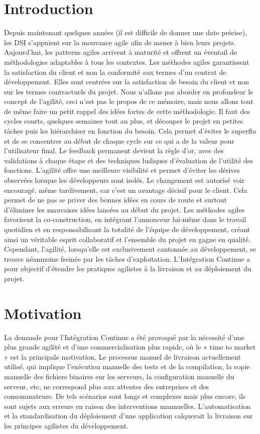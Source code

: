 \documentclass{report}
\begin{document}
    \section{Introduction}
    Depuis maintenant quelques années (il est difficile de donner une date précise), les DSI s’appuient sur la mouvance agile afin de mener à bien leurs projets. Aujourd’hui, les patterns agiles arrivent à maturité et offrent un éventail de méthodologies adaptables à tous les contextes. Les méthodes agiles garantissent la satisfaction du client et non la conformité aux termes d’un contrat de développement. Elles sont centrées sur la satisfaction de besoin du client et non sur les termes contractuels du projet. Nous n’allons pas aborder en profondeur le concept de l’agilité, ceci n’est pas le propos de ce mémoire, mais nous allons tout de même faire un petit rappel des idées fortes de cette méthodologie. Il faut des cycles courts, quelques semaines tout au plus, et découper le projet en petites tâches puis les hiérarchiser en fonction du besoin. Cela permet d’éviter le superflu et de se concentrer au début de chaque cycle sur ce qui a de la valeur pour l’utilisateur final. Le feedback permanent devient la règle d’or, avec des validations à chaque étape et des techniques ludiques d’évaluation de l’utilité des fonctions. L’agilité offre une meilleure visibilité et permet d’éviter les dérives observées lorsque les développeurs sont isolés. Le changement est autorisé voir encouragé, même tardivement, car c’est un avantage décisif pour le client. Cela permet de ne pas se priver des bonnes idées en cours de route et surtout d’éliminer les mauvaises idées lancées au début du projet. Les méthodes agiles favorisent la co-construction, en intégrant l’annonceur lui-même dans le travail quotidien et en responsabilisant la totalité de l’équipe de développement, créant ainsi un véritable esprit collaboratif et l’ensemble du projet en gagne en qualité.\\

    Cependant, l’agilité, lorsqu’elle est exclusivement cantonnée au développement, se trouve néanmoins freinée par les tâches d’exploitation. L'Intégration Continue a pour objectif d’étendre les pratiques agilistes à la livraison et au déploiement du projet.

    \section{Motivation}
    La demande pour l'Intégration Continue a été provoqué par la nécessité d'une plus grande agilité et d'une commercialisation plus rapide, où le « time to market » est la principale motivation. Le processus manuel de livraison actuellement utilisé, qui implique l'exécution manuelle des tests et de la compilation, la copie manuelle des fichiers binaires sur les serveurs, la configuration manuelle du serveur, etc, ne correspond plus aux attentes des entreprises et des consommateurs. De tels scénarios sont longs et complexes mais plus encore, ils sont sujets aux erreurs en raison des interventions mannuelles. L'automatisation et la standardisation du déploiement d'une application calquerait la livraison sur les principes agilistes du développement.
\end{document}
